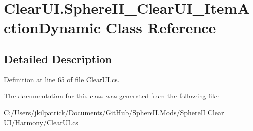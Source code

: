 \hypertarget{class_clear_u_i_1_1_sphere_i_i___clear_u_i___item_action_dynamic}{}\section{Clear\+U\+I.\+Sphere\+I\+I\+\_\+\+Clear\+U\+I\+\_\+\+Item\+Action\+Dynamic Class Reference}
\label{class_clear_u_i_1_1_sphere_i_i___clear_u_i___item_action_dynamic}


\subsection{Detailed Description}


Definition at line 65 of file Clear\+U\+I.\+cs.



The documentation for this class was generated from the following file\+:\begin{DoxyCompactItemize}
\item 
C\+:/\+Users/jkilpatrick/\+Documents/\+Git\+Hub/\+Sphere\+I\+I.\+Mods/\+Sphere\+I\+I Clear U\+I/\+Harmony/\mbox{\hyperlink{_clear_u_i_8cs}{Clear\+U\+I.\+cs}}\end{DoxyCompactItemize}
